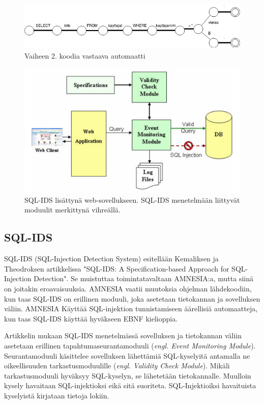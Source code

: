 \documentclass[finnish]{tktltiki2}
\theoremstyle{definition}
\theoremstyle{remark}
\begin{document}
		\begin{figure}[h!]
		\caption{Vaiheen 2. koodia vastaava automaatti}
		\includegraphics[scale=0.5]{kandi}
		\end{figure}

		\begin{figure}[b!]
			\caption{SQL-IDS lisättynä web-sovellukseen. SQL-IDS menetelmään liittyvät moduulit merkittynä vihreällä. \cite{sqlids}}
			\includegraphics[scale=0.55]{sqlids}
		\end{figure}
		
	\subsection{SQL-IDS}
	SQL-IDS (SQL-Injection Detection System) esitellään Kemaliksen ja Theodroksen artikkelissa "SQL-IDS: A Specification-based Approach for SQL-Injection Detection"\space\cite{sqlids}. Se muistuttaa toimintatavaltaan AMNESIA:a, mutta siinä on joitakin eroavaisuuksia. AMNESIA vaatii muutoksia ohjelman lähdekoodiin, kun taas SQL-IDS on erillinen moduuli, joka asetetaan tietokannan ja sovelluksen väliin. AMNESIA Käyttää SQL-injektion tunnistamiseen äärellisiä automaatteja, kun taas SQL-IDS käyttää hyväkseen EBNF kielioppia.
	
	Artikkelin mukaan SQL-IDS menetelmässä sovelluksen ja tietokannan väliin asetetaan erillinen tapahtumaseurantamoduuli (\textit{engl. Event Monitoring Module}). Seurantamoduuli käsittelee sovelluksen lähettämiä SQL-kyselyitä antamalla ne oikeellisuuden tarkastusmoduulille (\textit{engl. Validity Check Module}). Mikäli tarkastusmoduuli hyväksyy SQL-kyselyn, se lähetetään tietokannalle. Muulloin kysely havaitaan SQL-injektioksi eikä sitä suoriteta. SQL-Injektioiksi havaituista kyselyistä kirjataan tietoja lokiin.
	
\end{document}
